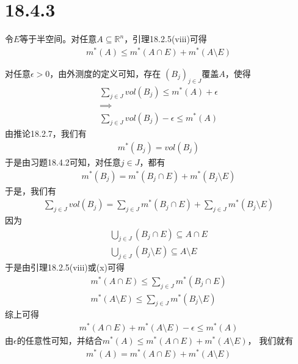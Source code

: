 \documentclass{article}
\begin{document}
\section*{18.4.3}

令$E$等于半空间。对任意$A \subseteq \mathbb{R}^n$，引理18.2.5(viii)可得
\begin{align*}
  m^{\ast}(A) \leq m^{\ast}(A \cap E) + m^{\ast}(A \setminus E)
\end{align*}

对任意$\epsilon > 0$，由外测度的定义可知，存在
$(B_j)_{j \in J}$覆盖$A$，使得
\begin{align*}
  \sum\limits_{j \in J} vol(B_j) \leq m^{\ast}(A) + \epsilon \\
  \implies                                                   \\
  \sum\limits_{j \in J} vol(B_j) - \epsilon \leq m^{\ast}(A)
\end{align*}
由推论18.2.7，我们有
\begin{align*}
  m^{\ast}(B_j) = vol(B_j)
\end{align*}
于是由习题18.4.2可知，对任意$j \in J$，都有
\begin{align*}
  m^{\ast}(B_j) = m^{\ast}(B_j \cap E) + m^{\ast}(B_j \setminus E)
\end{align*}
于是，我们有
\begin{align*}
  \sum\limits_{j \in J} vol(B_j) = \sum\limits_{j \in J} m^{\ast}(B_j \cap E)  + \sum\limits_{j \in J} m^{\ast}(B_j \setminus E)
\end{align*}
因为
\begin{align*}
  \bigcup \limits_{j \in J} (B_j \cap E) \subseteq A \cap E \\
  \bigcup \limits_{j \in J} (B_j \setminus E) \subseteq A \setminus E
\end{align*}
于是由引理18.2.5(viii)或(x)可得
\begin{align*}
  m^{\ast}(A \cap E) \leq \sum\limits_{j \in J} m^{\ast}(B_j \cap E) \\
  m^{\ast}(A \setminus E) \leq \sum\limits_{j \in J} m^{\ast}(B_j \setminus E)
\end{align*}
综上可得
\begin{align*}
  m^{\ast}(A \cap E) + m^{\ast}(A \setminus E) -\epsilon \leq m^{\ast}(A)
\end{align*}
由$\epsilon$的任意性可知，并结合$m^{\ast}(A) \leq m^{\ast}(A \cap E) + m^{\ast}(A \setminus E)$，
我们就有
\begin{align*}
  m^{\ast}(A) = m^{\ast}(A \cap E) + m^{\ast}(A \setminus E)
\end{align*}
\end{document}
